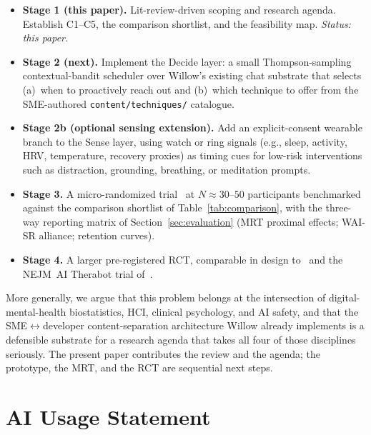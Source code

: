 \documentclass[10pt,conference]{article}
\newcommand{\secref}[1]{Section~\ref{#1}}
\newcommand{\tabref}[1]{Table~\ref{#1}}
\begin{document}
\begin{itemize}\setlength{\itemsep}{0pt}
  \item \textbf{Stage 1 (this paper).} Lit-review-driven scoping and
    research agenda. Establish C1--C5, the comparison shortlist, and
    the feasibility map. \emph{Status: this paper.}
  \item \textbf{Stage 2 (next).} Implement the Decide layer: a small
    Thompson-sampling contextual-bandit scheduler over Willow's
    existing chat substrate that selects (a)~when to proactively
    reach out and (b)~which technique to offer from the SME-authored
    \texttt{content/techniques/} catalogue.
  \item \textbf{Stage 2b (optional sensing extension).} Add an
    explicit-consent wearable branch to the Sense layer, using watch or
    ring signals (e.g., sleep, activity, HRV, temperature, recovery
    proxies) as timing cues for low-risk interventions such as
    distraction, grounding, breathing, or meditation prompts.
  \item \textbf{Stage 3.} A micro-randomized
    trial~\cite{Klasnja2015MRT,Liao2016MRTSampleSize,Seewald2019MRTData}
    at $N\!\approx\!30\text{--}50$ participants benchmarked against
    the comparison shortlist of \tabref{tab:comparison}, with the
    three-way reporting matrix of \secref{sec:evaluation} (MRT
    proximal effects; WAI-SR alliance; retention curves).
  \item \textbf{Stage 4.} A larger pre-registered RCT, comparable in
    design to~\cite{Aguilera2024DIAMANTERL} and the NEJM~AI Therabot
    trial of~\cite{Heinz2025TherabotRCT}.
\end{itemize}

More generally, we argue that this problem belongs at the
intersection of digital-mental-health biostatistics, HCI, clinical
psychology, and AI safety, and that the SME$\leftrightarrow$developer
content-separation architecture Willow already implements is a
defensible substrate for a research agenda that takes all four of
those disciplines seriously. The present paper contributes the
review and the agenda; the prototype, the MRT, and the RCT are
sequential next steps.

\section{AI Usage Statement}\label{sec:ai-usage}
\end{document}
